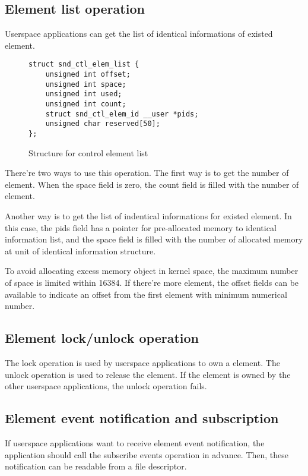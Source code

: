 \documentclass[onecolumn]{article}
\begin{document}
\subsection{Element list operation}

Userspace applications can get the list of identical informations of existed element.

\begin{figure}[htbp]
\small
\begin{verbatim}
struct snd_ctl_elem_list {
	unsigned int offset;
	unsigned int space;
	unsigned int used;
	unsigned int count;
	struct snd_ctl_elem_id __user *pids;
	unsigned char reserved[50];
};
\end{verbatim}
\caption{{Structure for control element list}}
\label{snd-ctl-elem-list}
\end{figure}

There're two ways to use this operation. The first way is to get the number of element. When the space field is zero, the count field is filled with the number of element.

Another way is to get the list of indentical informations for existed element. In this case, the pids field has a pointer for pre-allocated memory to identical information list, and the space field is filled with the number of allocated memory at unit of identical information structure.

To avoid allocating excess memory object in kernel space, the maximum number of space is limited within 16384. If there're more element, the offset fields can be available to indicate an offset from the first element with minimum numerical number.

\subsection{Element lock/unlock operation}

The lock operation is used by userspace applications to own a element. The unlock operation is used to release the element. If the element is owned by the other userspace applications, the unlock operation fails.

\subsection{Element event notification and subscription}

If userspace applications want to receive element event notification, the application should call the subscribe events operation in advance. Then, these notification can be readable from a file descriptor.
\end{document}

